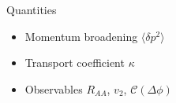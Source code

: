 \documentclass[aspectratio=169,11pt,usenames,dvipsnames]{beamer}
\begin{document}
\begin{frame}{}
\begin{center}
{\begin{center}
\begin{columns}
\begin{column}{0.45\textwidth}
                    {\Large\color{pinky} Quantities}
                    \begin{itemize}
                        \item Momentum broadening $\langle \delta p^2\rangle$
                        \item Transport coefficient $\kappa$
                        \item Observables $R_{AA}$, $v_2$, $\mathcal{C}(\Delta\phi)$
                    \end{itemize}
                \end{column}
                \begin{column}{0.066\textwidth}\end{column}
            \end{columns}
        \end{center}
        }
    \end{center}
\end{frame}
\end{document}
